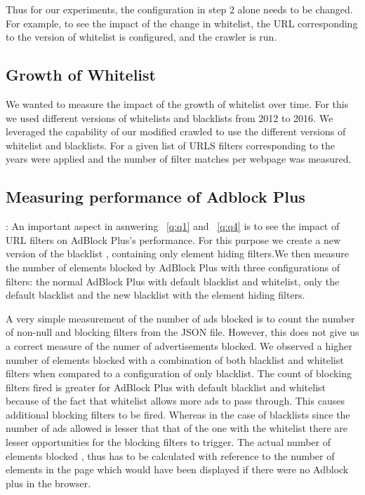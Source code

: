 Thus for our experiments, the configuration in step 2 alone needs to be changed. For example, to see the impact of the change in whitelist, the URL corresponding to the version of whitelist is configured, and the crawler is run.

\subsection{Growth of Whitelist}
We wanted to measure the impact of the growth of whitelist over time. For this we used different versions of whitelists and blacklists  from  2012 to 2016. We leveraged the capability of our modified crawled to  use the different versions of whitelist and blacklists. For a given list of URLS filters corresponding to the years were applied and the number of filter matches per webpage was measured.

\subsection{Measuring performance of Adblock Plus}:
An important aspect in asnwering ~\ref{q:q1} and ~\ref{q:q4} is to see the impact of URL filters on AdBlock Plus's performance. For this purpose we  create a new version of the blacklist , containing only element hiding filters.We then measure the number of elements blocked by AdBlock Plus with three configurations of filters: the normal AdBlock Plus with default blacklist and whitelist, only the default blacklist and the new blacklist with the  element hiding filters.

A very simple measurement of the number of ads blocked is to count the number of non-null and blocking filters from the JSON file.
However, this does not give us a correct measure of the numer of advertisements blocked.
We observed a higher number of elements blocked with a combination of both blacklist and whitelist filters when compared to a configuration of only blacklist.
The count of blocking filters fired is greater for AdBlock Plus with default blacklist and whitelist because  of the fact that whitelist allows more ads to pass through. This causes additional blocking filters to be fired.
Whereas in the case of blacklists since the number of ads  allowed is lesser that that of the  one with the whitelist there are lesser opportunities for the blocking filters to trigger.
The actual number of elements blocked , thus has to be calculated  with reference to the number of elements in the page which would have been displayed  if there were no Adblock plus in the browser.

